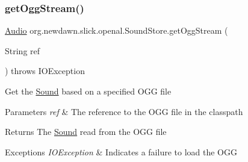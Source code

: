 \mbox{\label{classorg_1_1newdawn_1_1slick_1_1openal_1_1_sound_store_af99b33a4a137e1b51e3202b6fb5b02ea}} 
\subsubsection{\texorpdfstring{get\+Ogg\+Stream()}{getOggStream()}\hspace{0.1cm}{\footnotesize\ttfamily [1/2]}}
{\footnotesize\ttfamily \mbox{\hyperlink{interfaceorg_1_1newdawn_1_1slick_1_1openal_1_1_audio}{Audio}} org.\+newdawn.\+slick.\+openal.\+Sound\+Store.\+get\+Ogg\+Stream (\begin{DoxyParamCaption}\item[{String}]{ref }\end{DoxyParamCaption}) throws I\+O\+Exception\hspace{0.3cm}{\ttfamily [inline]}}

Get the \mbox{\hyperlink{classorg_1_1newdawn_1_1slick_1_1_sound}{Sound}} based on a specified O\+GG file


\begin{DoxyParams}{Parameters}
{\em ref} & The reference to the O\+GG file in the classpath \\
\hline
\end{DoxyParams}
\begin{DoxyReturn}{Returns}
The \mbox{\hyperlink{classorg_1_1newdawn_1_1slick_1_1_sound}{Sound}} read from the O\+GG file 
\end{DoxyReturn}

\begin{DoxyExceptions}{Exceptions}
{\em I\+O\+Exception} & Indicates a failure to load the O\+GG \\
\hline
\end{DoxyExceptions}

